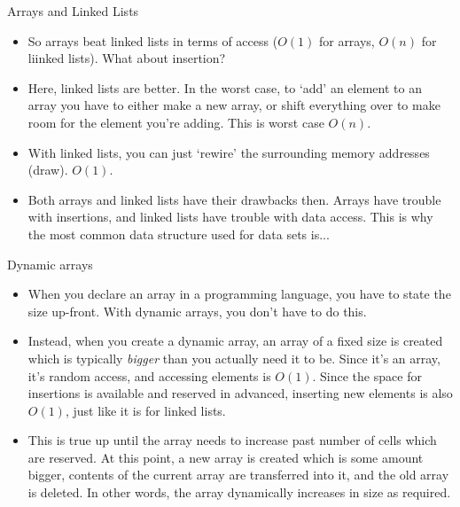 \documentclass{beamer}
\begin{document}
\begin{frame}{Arrays and Linked Lists}
    \begin{itemize}
        \item So arrays beat linked lists in terms of access ($O(1)$ for arrays, $O(n)$ for liinked lists). What about insertion? 
        \pause
        \item Here, linked lists are better. In the worst case, to `add' an element to an array you have to either make a new array, or shift everything over to make room for the element you're adding. This is worst case $O(n)$. 
        \item With linked lists, you can just `rewire' the surrounding memory addresses (draw). $O(1)$. 
        \item Both arrays and linked lists have their drawbacks then. Arrays have trouble with insertions, and linked lists have trouble with data access. This is why the most common data structure used for data sets is...
    \end{itemize}
\end{frame}

\begin{frame}{Dynamic arrays}
    \begin{itemize}
        \item When you declare an array in a programming language, you have to state the size up-front. With dynamic arrays, you don't have to do this.
        \pause 
        \item Instead, when you create a dynamic array, an array of a fixed size is created which is typically \emph{bigger} than you actually need it to be. Since it's an array, it's random access, and accessing elements is $O(1)$. Since the space for insertions is available and reserved in advanced, inserting new elements is also $O(1)$, just like it is for linked lists.
        \pause
        \item This is true up until the array needs to increase past number of cells which are reserved. At this point, a new array is created which is some amount bigger, contents of the current array are transferred into it, and the old array is deleted. In other words, the array dynamically increases in size as required. 
    \end{itemize}
\end{frame}
\end{document}
